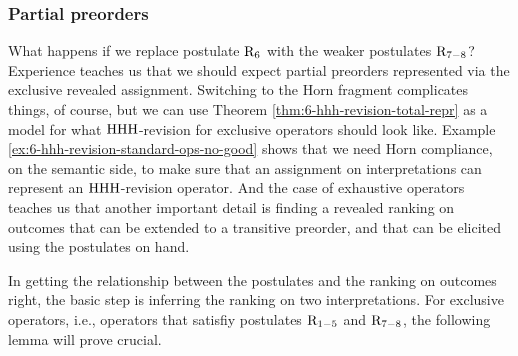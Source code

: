 \subsubsection{Partial preorders}
What happens if we replace postulate $\mathrm{R}_{6}$
with the weaker postulates $\mathrm{R}_{7-8}$?
Experience teaches us that we should expect partial preorders
represented via the exclusive revealed assignment.
Switching to the Horn fragment complicates things,
of course, but we can use Theorem \ref{thm:6-hhh-revision-total-repr} as a model
for what ${\mathrm{HHH}}$-revision for exclusive operators should look like.
Example \ref{ex:6-hhh-revision-standard-ops-no-good} shows that 
we need Horn compliance, on the semantic side,
to make sure that an assignment on interpretations 
can represent an ${\mathrm{HHH}}$-revision operator.
And the case of exhaustive operators teaches us that
another important detail is finding a revealed ranking on outcomes
that can be extended to a transitive preorder,
and that can be elicited using the postulates on hand.

In getting the relationship between the postulates 
and the ranking on outcomes right,
the basic step is inferring the ranking on two interpretations.
For exclusive operators, i.e., operators 
that satisfiy postulates $\mathrm{R}_{1-5}$ and $\mathrm{R}_{7-8}$,
the following lemma will prove crucial.

